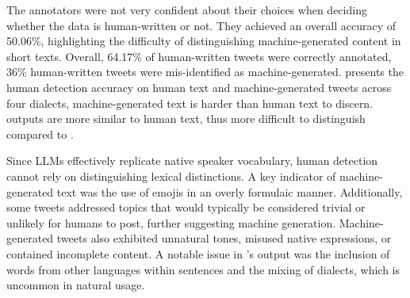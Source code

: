 The annotators were not very confident about their choices when deciding whether the data is human-written or not. They achieved an overall accuracy of 50.06\%, highlighting the difficulty of distinguishing machine-generated content in short texts. 
Overall, 64.17\% of human-written tweets were correctly annotated, 36\% human-written tweets were mis-identified as machine-generated.
 presents the human detection accuracy on human text and machine-generated tweets across four dialects, machine-generated text is harder than human text to discern. \gptfouro outputs are more similar to human text, thus more difficult to distinguish compared to \qwentwo.

Since LLMs effectively replicate native speaker vocabulary, human detection cannot rely on distinguishing lexical distinctions. A key indicator of machine-generated text was the use of emojis in an overly formulaic manner. Additionally, some tweets addressed topics that would typically be considered trivial or unlikely for humans to post, further suggesting machine generation.  
Machine-generated tweets also exhibited unnatural tones, misused native expressions, or contained incomplete content. A notable issue in \qwentwo's output was the inclusion of words from other languages within sentences and the mixing of dialects, which is uncommon in natural usage.


